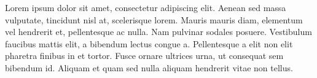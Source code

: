 \par{
Lorem ipsum dolor sit amet, consectetur adipiscing elit. Aenean sed massa vulputate, tincidunt nisl at, scelerisque lorem. Mauris mauris diam, elementum vel hendrerit et, pellentesque ac nulla. Nam pulvinar sodales posuere. Vestibulum faucibus mattis elit, a bibendum lectus congue a. Pellentesque a elit non elit pharetra finibus in et tortor. Fusce ornare ultrices urna, ut consequat sem bibendum id. Aliquam et quam sed nulla aliquam hendrerit vitae non tellus.
}